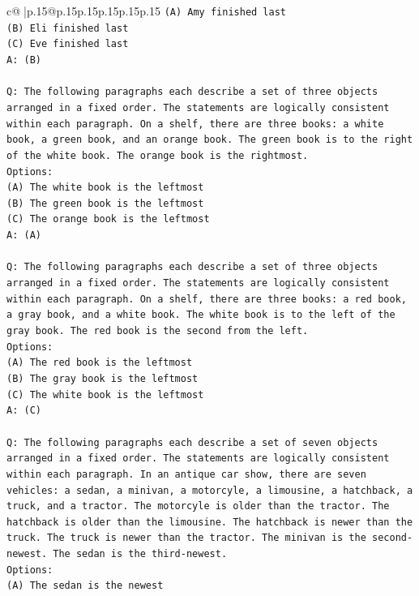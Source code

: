 \documentclass{article}
\begin{document}
{\begin{supertabular}{c@{$\;$}|p{.15\linewidth}@{}p{.15\linewidth}p{.15\linewidth}p{.15\linewidth}p{.15\linewidth}p{.15\linewidth}}
{{{\texttt{(A) Amy finished last} \\
\texttt{(B) Eli finished last} \\
\texttt{(C) Eve finished last} \\
\texttt{A: (B)} \\
\\ 
\texttt{Q: The following paragraphs each describe a set of three objects arranged in a fixed order. The statements are logically consistent within each paragraph. On a shelf, there are three books: a white book, a green book, and an orange book. The green book is to the right of the white book. The orange book is the rightmost.} \\
\texttt{Options:} \\
\texttt{(A) The white book is the leftmost} \\
\texttt{(B) The green book is the leftmost} \\
\texttt{(C) The orange book is the leftmost} \\
\texttt{A: (A)} \\
\\ 
\texttt{Q: The following paragraphs each describe a set of three objects arranged in a fixed order. The statements are logically consistent within each paragraph. On a shelf, there are three books: a red book, a gray book, and a white book. The white book is to the left of the gray book. The red book is the second from the left.} \\
\texttt{Options:} \\
\texttt{(A) The red book is the leftmost} \\
\texttt{(B) The gray book is the leftmost} \\
\texttt{(C) The white book is the leftmost} \\
\texttt{A: (C)} \\
\\ 
\texttt{Q: The following paragraphs each describe a set of seven objects arranged in a fixed order. The statements are logically consistent within each paragraph. In an antique car show, there are seven vehicles: a sedan, a minivan, a motorcyle, a limousine, a hatchback, a truck, and a tractor. The motorcyle is older than the tractor. The hatchback is older than the limousine. The hatchback is newer than the truck. The truck is newer than the tractor. The minivan is the second{-}newest. The sedan is the third{-}newest.} \\
\texttt{Options:} \\
\texttt{(A) The sedan is the newest} \\
}}}
\end{supertabular}}
\end{document}
